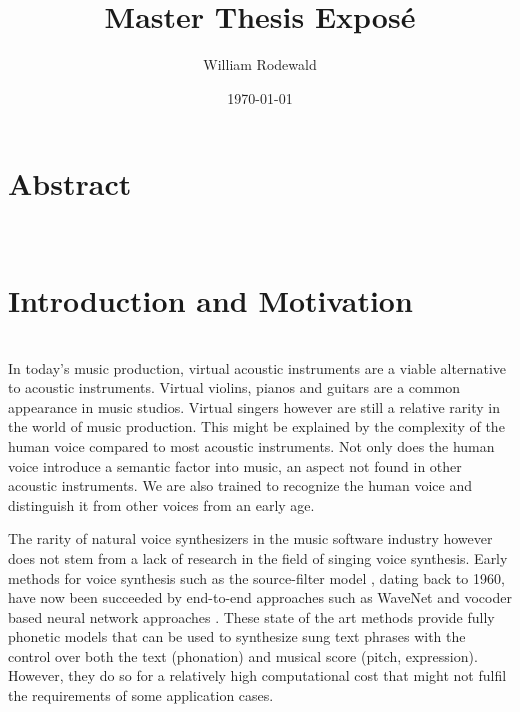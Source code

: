 \documentclass{article}
\title{Master Thesis Exposé}
\author{William Rodewald}
\date{\today}
\newcommand{\comment}[1]{{\color{red}{[#1]}}}
\begin{document}
\maketitle

\tableofcontents

\newpage
 
\section{Abstract}
\comment{ The abstract summarizes the exposés content. }\\

\section{Introduction and Motivation}
\label{sec:Intro}
\comment{This sections introduces the motivation and research goals for this thesis.}\\


In today's music production, virtual acoustic instruments are a viable alternative to acoustic instruments. Virtual violins, pianos and guitars are a common appearance in music studios. Virtual singers however are still a relative rarity in the world of music production. \comment{citation needed} This might be explained by the complexity of the human voice compared to most acoustic instruments. Not only does the human voice introduce a semantic factor into music, an aspect not found in other acoustic instruments. We are also trained to recognize the human voice and distinguish it from other voices from an early age.

The rarity of natural voice synthesizers in the music software industry however does not stem from a lack of research in the field of singing voice synthesis. Early methods for voice synthesis such as the source-filter model \cite{fant_acoustic_1960}, dating back to 1960, have now been succeeded by end-to-end approaches such as WaveNet \cite{oord_wavenet:_2016} and vocoder based neural network approaches \cite{chandna_wgansing:_2019}\cite{blaauw_neural_2017}. These state of the art methods provide fully phonetic models that can be used to synthesize sung text phrases with the control over both the text (phonation) and musical score (pitch, expression). However, they do so for a relatively high computational cost that might not fulfil the requirements of some application cases. 
\end{document}
